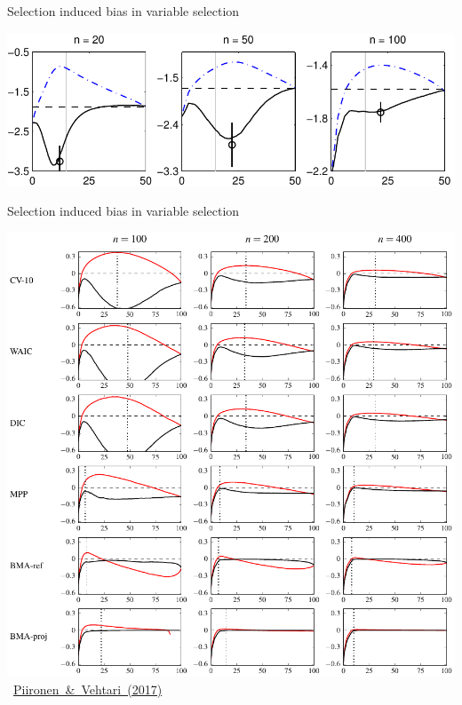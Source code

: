 \documentclass[english,t]{beamer}
\begin{document}
\begin{frame}

  {\Large\color{navyblue} Selection induced bias in variable selection}

  \includegraphics[width=\textwidth]{cv.pdf}

\end{frame}

\begin{frame}

  {\Large\color{navyblue} Selection induced bias in variable selection}

  \includegraphics[height=0.88\textheight]{simulated_searchpath.pdf}
   \vspace{-1.5\baselineskip}
   \mbox{{\hspace{8cm} \footnotesize \href{http://link.springer.com/article/10.1007/s11222-016-9649-y}{Piironen \& Vehtari (2017)}}}

\end{frame}
\end{document}
